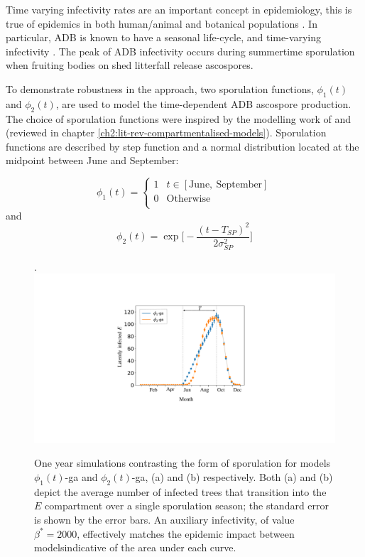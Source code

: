 Time varying infectivity rates are an important concept in epidemiology, this is true of epidemics in both human/animal \cite{svensson2007note, liu2012infectious} 
and botanical populations \cite{suffert2018some, leclerc2014estimating, time-varying-infectivity}.
In particular, ADB is known to have a seasonal life-cycle, and time-varying infectivity \cite{grosdidier2018tracking, hietala2013invasive}. 
The peak of ADB infectivity occurs during summertime sporulation when fruiting bodies on shed litterfall release ascospores.

To demonstrate robustness in the approach, two sporulation functions, $\phi_1(t)$ and $\phi_2(t)$, are used to model the time-dependent ADB ascospore production.
The choice of sporulation functions were inspired by the modelling work of \cite{time-varying-infectivity} and \cite{segarra2001epidemic}
(reviewed in chapter \ref{ch2:lit-rev-compartmentalised-models}). 
Sporulation functions are described by step function and a normal distribution located at the midpoint between June and September:

\begin{equation}
\phi_1(t)  = \left\{
\begin{array}{ll}
      1 &  t \in [\mathrm{June,\ September}] \\
      0 & \mathrm{Otherwise} \\
\end{array} 
\right.
\end{equation}
and 
\begin{equation}
     \phi_2(t) =  \exp\big[-\frac{(t - T_{SP})^2}{2\sigma_{SP}^2}\big]
\end{equation}

\begin{figure}.
    \centering
    \includegraphics[scale=0.35]{chapter6/figures/fig5-sporulation.pdf}
    \caption{One year simulations contrasting the form of sporulation for models $\phi_1(t)$-ga and $\phi_2(t)$-ga, (a) and (b) respectively. 
    Both (a) and (b) depict the average number of infected trees that transition into the $E$ compartment over a single sporulation season; the standard error is shown by the error bars.
    An auxiliary infectivity, of value $\beta^*=2000$, effectively matches the epidemic impact between models\textemdash indicative of the area under each curve.}
    \label{fig:SEIR-sporulation}
\end{figure}

